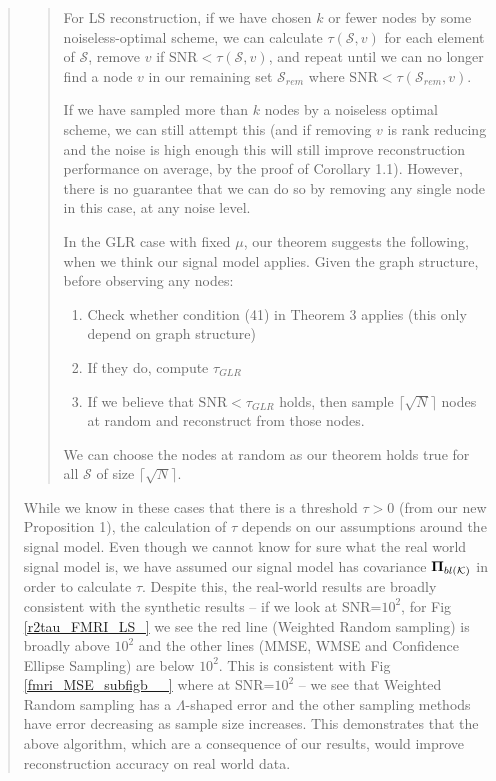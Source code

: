 \documentclass[11pt,onecolumn,journal]{IEEEtran}
\theoremstyle{definition}
\newcommand{\set}[1]{\mathcal{#1}}
\begin{document}
\begin{quote}
\begin{quote}
    For LS reconstruction, if we have chosen $k$ or fewer nodes by some noiseless-optimal scheme, we can calculate $\tau(\set{S},v)$ for each element of $\set{S}$, remove $v$ if $\text{SNR} < \tau(\set{S},v)$, and repeat until we can no longer find a node $v$ in our remaining set $\set{S}_{rem}$ where $\text{SNR} < \tau(\set{S}_{rem},v)$.

    If we have sampled more than $k$ nodes by a noiseless optimal scheme, we can still attempt this (and if removing $v$ is rank reducing and the noise is high enough this will still improve reconstruction performance on average, by the proof of Corollary 1.1). However, there is no guarantee that we can do so by removing any single node in this case, at any noise level.

    In the GLR case with fixed $\mu$, our theorem suggests the following, when we think our signal model applies. Given the graph structure, before observing any nodes:
\begin{enumerate}
    \item Check whether  condition (41) in Theorem 3 applies (this only depend on graph structure)
    \item If they do, compute $\tau_{GLR}$
    \item If we believe that $\text{SNR} < \tau_{GLR}$ holds, then sample $\lceil\sqrt{N}\rceil$ nodes at random and reconstruct from those nodes.
\end{enumerate}
We can choose the nodes at random as our theorem holds true for all $\set{S}$ of size $\lceil\sqrt{N}\rceil$.
\end{quote}

While we know in these cases that there is a threshold $\tau > 0$ (from our new Proposition 1), the calculation of $\tau$ depends on our assumptions around the signal model. Even though we cannot know for sure what the real world signal model is, we have assumed our signal model has covariance $\projbl$ in order to calculate $\tau$. Despite this, the real-world results are broadly consistent with the synthetic results -- if we look at SNR=$10^{2}$, for Fig \ref{r2tau_FMRI_LS_} we see the red line (Weighted Random sampling) is broadly above $10^2$ and the other lines (MMSE, WMSE and Confidence Ellipse Sampling) are below $10^2$. This is consistent with Fig \ref{fmri_MSE_subfigb__} where at SNR=$10^{2}$ -- we see that Weighted Random sampling has a $\Lambda$-shaped error and the other sampling methods have error decreasing as sample size increases. This demonstrates that the above algorithm, which are a consequence of our results, would improve reconstruction accuracy on real world data.



\end{quote}
\end{document}
